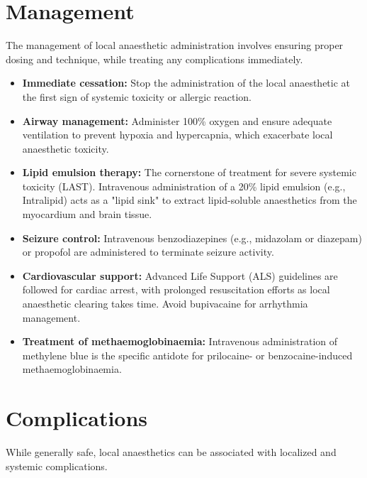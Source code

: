 \section*{Management}
The management of local anaesthetic administration involves ensuring proper dosing and technique, while treating any complications immediately.

\begin{itemize}
    \item \textbf{Immediate cessation:} Stop the administration of the local anaesthetic at the first sign of systemic toxicity or allergic reaction.
    \item \textbf{Airway management:} Administer 100\% oxygen and ensure adequate ventilation to prevent hypoxia and hypercapnia, which exacerbate local anaesthetic toxicity.
    \item \textbf{Lipid emulsion therapy:} The cornerstone of treatment for severe systemic toxicity (LAST). Intravenous administration of a 20\% lipid emulsion (e.g., Intralipid) acts as a "lipid sink" to extract lipid-soluble anaesthetics from the myocardium and brain tissue.
    \item \textbf{Seizure control:} Intravenous benzodiazepines (e.g., midazolam or diazepam) or propofol are administered to terminate seizure activity.
    \item \textbf{Cardiovascular support:} Advanced Life Support (ALS) guidelines are followed for cardiac arrest, with prolonged resuscitation efforts as local anaesthetic clearing takes time. Avoid bupivacaine for arrhythmia management.
    \item \textbf{Treatment of methaemoglobinaemia:} Intravenous administration of methylene blue is the specific antidote for prilocaine- or benzocaine-induced methaemoglobinaemia.
\end{itemize}

\section*{Complications}
While generally safe, local anaesthetics can be associated with localized and systemic complications.

